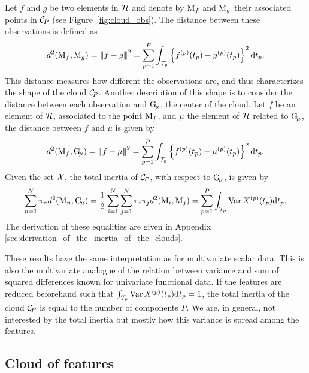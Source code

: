 Let $f$ and $g$ be two elements in $\mathcal{H}$ and denote by $\mathrm{M}_f$ and $\mathrm{M}_g$ their associated points in $\mathcal{C}_{\!P}$ (see Figure~\ref{fig:cloud_obs}). The distance between these observations is defined as
\begin{equation}\label{eq:distance_obs}
    d^2(\mathrm{M}_f, \mathrm{M}_g) = \left|\!\left|\!\left|f - g\right|\!\right|\!\right|^2 = \sum_{p = 1}^P \int_{\mathcal{T}_{p}}\left\{f^{(p)}(t_p) - g^{(p)}(t_p)\right\}^2 {\rm d} t_p.
\end{equation}
This distance measures how different the observations are, and thus characterizes the shape of the cloud $\mathcal{C}_{\!P}$. Another description of this shape is to consider the distance between each observation and $\mathrm{G}_{\!\mu}$, the center of the cloud. Let $f$ be an element of $\mathcal{H}$, associated to the point $\mathrm{M}_f$, and $\mu$ the element of $\mathcal{H}$ related to $\mathrm{G}_{\!\mu}$, the distance between $f$ and $\mu$ is given by
\begin{equation}\label{eq:distance_center}
    d^2(\mathrm{M}_f, \mathrm{G}_{\!\mu}) = \left|\!\left|\!\left|f - \mu\right|\!\right|\!\right|^2 = \sum_{p = 1}^P \int_{\mathcal{T}_{p}}\left\{f^{(p)}(t_p) - \mu^{(p)}(t_p)\right\}^2 {\rm d} t_p.
\end{equation}
Given the set $\mathcal{X}$, the total inertia of $\mathcal{C}_{\!P}$, with respect to $\mathrm{G}_{\!\mu}$, is given by
\begin{equation}\label{eq:inertia}
    \sum_{n = 1}^N \pi_n d^2(\mathrm{M}_n, \mathrm{G}_{\!\mu}) = \frac{1}{2}\sum_{i = 1}^N \sum_{j = 1}^N \pi_i \pi_j d^2(\mathrm{M}_i, \mathrm{M}_j) = \sum_{p = 1}^P \int_{\mathcal{T}_{p}}\operatorname{Var}{X^{(p)}(t_p)} {\rm d} t_p.
\end{equation}
The derivation of these equalities are given in Appendix \ref{sec:derivation_of_the_inertia_of_the_clouds}.

\begin{remark}
    These results have the same interpretation as for multivariate scalar data. This is also the multivariate analogue of the relation between variance and sum of squared differences known for univariate functional data. If the features are reduced beforehand such that $\int_{\mathcal{T}_{p}} \operatorname{Var}X^{(p)} (t_p) {\rm d} t_p = 1$, the total inertia of the cloud $\mathcal{C}_{\!P}$ is equal to the number of components $P$. We are, in general, not interested by the total inertia but mostly how this variance is spread among the features.
\end{remark}


\subsection{Cloud of features} %
\label{sub:cloud_of_features}

